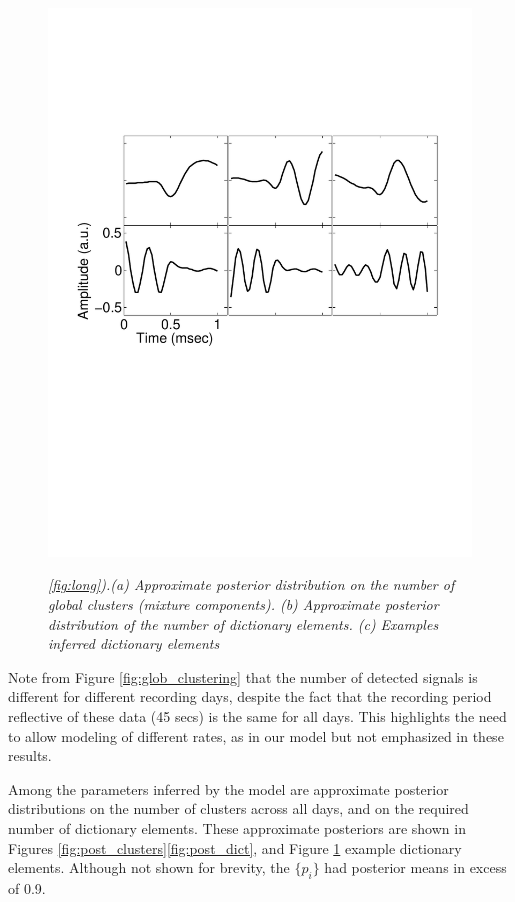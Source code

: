 \documentclass[journal]{IEEEtran}
\begin{document}
\begin{figure}[!htbp]
{   \includegraphics[width=1.0\linewidth] {figs_new/Dictionary_elements.pdf}
   \label{fig:dict_examples}
 }
  \caption{\small \emph{
 \ref{fig:long}).(a) Approximate posterior distribution on the number of global clusters (mixture components). (b) Approximate posterior distribution of the
number of dictionary elements. (c) Examples inferred
dictionary elements }}
\end{figure}


Note from Figure \ref{fig:glob_clustering} that the number of
detected signals is different for different recording days, despite
the fact that the recording period reflective of these data (45
secs) is the same for all days. This highlights the need to allow
modeling of different  rates, as in our model but not
emphasized in these results.

Among the parameters inferred by the model are approximate posterior
distributions on the number of clusters across all days, and on the
required number of dictionary elements. These approximate posteriors
are shown in Figures \ref{fig:post_clusters}\ref{fig:post_dict},
and  Figure \ref{fig:dict_examples}  example dictionary
elements. Although not shown for brevity, the $\{p_i\}$ had posterior means in excess of 0.9.
\end{document}
